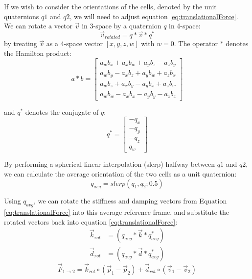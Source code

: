 {If we wish to consider the orientations of the cells, denoted by the unit quaternions $q1$ and $q2$, we will need to adjust equation \ref{eq:translationalForce}. \\
  
  We can rotate a vector $\vec{v}$ in 3-space by a quaternion $q$ in 4-space:
  \begin{equation}\label{eq:hamiltonprod}
  \vec{v}_{rotated} = q*\vec{v}*q^*
  \end{equation}
  by treating $\vec{v}$ as a 4-space vector $[x, y, z, w]$ with $w=0$.  The operator $*$ denotes the Hamilton product:
  \[ a*b =  \left[ \begin{array}{ccc}
a_wb_x + a_xb_w + a_yb_z - a_zb_y\\
a_wb_y - a_xb_z + a_yb_w + a_zb_x\\
a_wb_z + a_xb_y - a_yb_x + a_zb_w\\
a_wb_w - a_xb_x - a_yb_y - a_zb_z
 \end{array} \right] \] 
 
   and $q^*$ denotes the conjugate of $q$:
    \[ q^{*} =  \left[ \begin{array}{ccc}
-q_x\\
-q_y\\
-q_z\\
q_w
 \end{array} \right] \] 
 
By performing a spherical linear interpolation (slerp) halfway between $q1$ and $q2$, we can calculate the average orientation of the two cells as a unit quaternion:
  \[ q_{avg} = slerp(q_{1}, q_{2}; 0.5) \]
  
Using $q_{avg}$, we can rotate the stiffness and damping vectors from Equation \ref{eq:translationalForce} into this average reference frame, and substitute the rotated vectors back into equation \ref{eq:translationalForce}:
\begin{subequations}
\begin{align}
\label{eq:krotated}
 \vec{k}_{rot} &= (q_{avg}*\vec{k}*q_{avg}^*)\\
 \label{eq:drotated}
  \vec{d}_{rot} &= (q_{avg}*\vec{d}*q_{avg}^*)
  \end{align}
  \end{subequations}
  \begin{equation} \label{eq:translationalForceRotStep}
 \vec{F}_{1\rightarrow2} = \vec{k}_{rot} \circ (\vec{p}_1 - \vec{p}_2) + \vec{d}_{rot} \circ (\vec{v}_1 - \vec{v}_2)
 \end{equation}
 
}
